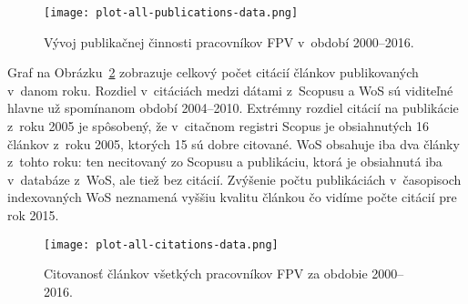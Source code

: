 \begin{figure}
  \centering
  \texttt{[image: plot-all-publications-data.png]}
  \caption{Vývoj publikačnej činnosti pracovníkov FPV v~období 2000--2016.}
  \label{fig:all.publications.plot}
\end{figure}

Graf na Obrázku~\ref{fig:all.citations.plot} zobrazuje celkový počet citácií
článkov publikovaných v~danom roku.  Rozdiel v~citáciách medzi dátami z~Scopusu
a WoS sú viditeľné hlavne už spomínanom období 2004--2010.  Extrémny rozdiel
citácií na publikácie z~roku 2005 je spôsobený, že v~citačnom registri Scopus je
obsiahnutých 16 článkov z~roku 2005, ktorých 15 sú dobre citované.  WoS obsahuje
iba dva články z~tohto roku: ten necitovaný zo Scopusu a publikáciu, ktorá je
obsiahnutá iba v~databáze z~WoS, ale tiež bez citácií.  Zvýšenie počtu
publikáciách v~časopisoch indexovaných WoS neznamená vyššiu kvalitu článkou čo
vidíme počte citácií pre rok 2015.

\begin{figure}
  \centering
  \texttt{[image: plot-all-citations-data.png]}
  \caption{Citovanosť článkov všetkých pracovníkov FPV za obdobie
    2000--2016.}
  \label{fig:all.citations.plot}
\end{figure}

